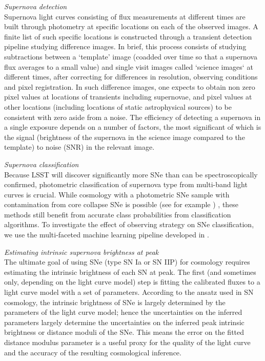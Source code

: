 {\emph{Supernova detection}}\\
Supernova light curves consisting of flux measurements at different times are built through photometry
at specific locations on each of the observed images. A finite list of such specific locations is
constructed through a transient detection pipeline studying difference images. In brief, this process
consists of studying subtractions between a  `template' image (coadded over time so that a supernova
flux averages to a small value) and single visit images called `science images` at different times,
after correcting for differences in resolution, observing conditions and pixel registration. In such
difference images, one expects to obtain non zero pixel values at locations of transients including
supernovae, and pixel values at other locations (including locations of static astrophysical
sources) to be
consistent with zero aside from a noise. The efficiency of detecting a supernova in a single
exposure
depends on a number of factors, the most significant of which is the signal (brightness of the supernova
in the science image compared to the template) to noise (SNR) in the relevant image.


{\emph{Supernova classification}}\\
Because LSST will discover significantly more SNe than can be spectroscopically confirmed,
photometric classification of supernova type from multi-band light curves is crucial. While cosmology
with a photometric SNe sample with contamination from core collapse SNe is possible (see for
example 
\citet{Kunz2007,Newling2011,Hlozek2012,Knights2013,Bernstein2012,Gjergo2013,Campbell2013,Rubin2015,Jones2016})
,
these methods still benefit from accurate class probabilities from classification algorithms. To
investigate the effect of observing strategy on SNe classification, we use the multi-faceted machine
learning pipeline developed in \citet{Lochner2016}.


{\emph{Estimating intrinsic supernova brightness at peak}}\\
The ultimate goal of using SNe (type SN Ia or
SN IIP) for cosmology requires estimating the intrinsic brightness of each SN at peak. The first (and
sometimes only, depending on the light curve
model) step is fitting the calibrated fluxes to a light curve model with
a set of parameters. According to the ansatz used in SN cosmology, the
intrinsic brightness of SNe is largely determined by the parameters of
the light curve model; hence the uncertainties on the inferred
parameters largely determine the uncertainties on the inferred peak
intrinsic brightness or distance moduli of the SNe. This means the error on the fitted distance
modulus parameter is a useful proxy for the quality of the light curve and the accuracy of
the resulting cosmological inference.


